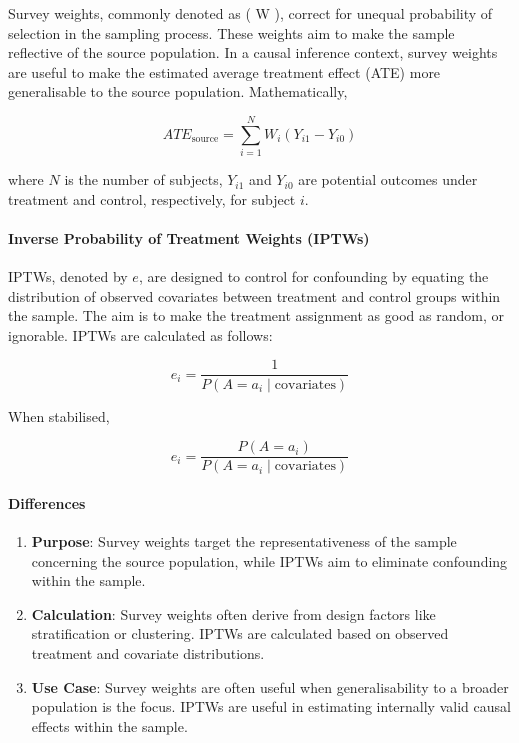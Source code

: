 \documentclass[
  singlecolumn]{article}
\let\oldparagraph\paragraph
\renewcommand{\paragraph}[1]{\oldparagraph{#1}\mbox{}}
\begin{document}
Survey weights, commonly denoted as ( W ), correct for unequal
probability of selection in the sampling process. These weights aim to
make the sample reflective of the source population. In a causal
inference context, survey weights are useful to make the estimated
average treatment effect (ATE) more generalisable to the source
population. Mathematically,

\[
ATE_{\text{source}} = \sum_{i=1}^N W_i \left( Y_{i1} - Y_{i0} \right)
\]

where \(N\) is the number of subjects, \(Y_{i1}\) and \(Y_{i0}\) are
potential outcomes under treatment and control, respectively, for
subject \(i\).

\paragraph{\texorpdfstring{\textbf{Inverse Probability of Treatment
Weights
(IPTWs)}}{Inverse Probability of Treatment Weights (IPTWs)}}\label{inverse-probability-of-treatment-weights-iptws}

IPTWs, denoted by \(e\), are designed to control for confounding by
equating the distribution of observed covariates between treatment and
control groups within the sample. The aim is to make the treatment
assignment as good as random, or ignorable. IPTWs are calculated as
follows:

\[
e_i = \frac{1}{P(A=a_i \mid \text{covariates})}
\]

When stabilised,

\[
e_i = \frac{P(A=a_i)}{P(A=a_i \mid \text{covariates})}
\]

\paragraph{\texorpdfstring{\textbf{Differences}}{Differences}}\label{differences}

\begin{enumerate}
\def\labelenumi{\arabic{enumi}.}
\item
  \textbf{Purpose}: Survey weights target the representativeness of the
  sample concerning the source population, while IPTWs aim to eliminate
  confounding within the sample.
\item
  \textbf{Calculation}: Survey weights often derive from design factors
  like stratification or clustering. IPTWs are calculated based on
  observed treatment and covariate distributions.
\item
  \textbf{Use Case}: Survey weights are often useful when
  generalisability to a broader population is the focus. IPTWs are
  useful in estimating internally valid causal effects within the
  sample.
\end{enumerate}
\end{document}
